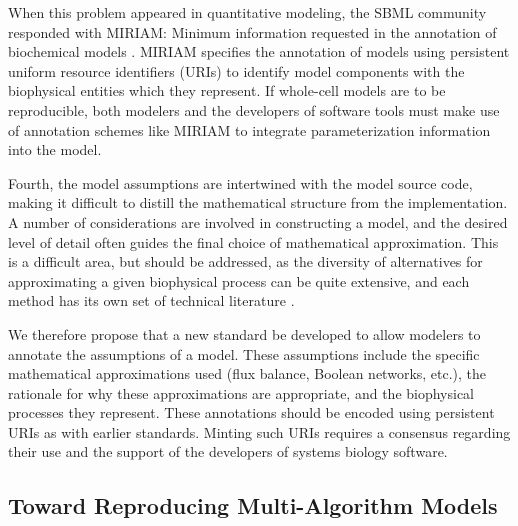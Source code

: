 \documentclass[journal,transmag,twoside]{IEEEtran}
\newcommand{\karrcomment}[2]{\pdfmarkupcomment[markup=Highlight,color=yellow,author={Jonathan Karr}]{#1}{#2}}
\begin{document}
When this problem appeared in quantitative modeling, the SBML community responded with MIRIAM:
Minimum information requested in the annotation of biochemical models \cite{novere2005minimum}.
MIRIAM specifies the annotation of models using persistent uniform resource identifiers (URIs) to identify model
components with the biophysical entities which they represent.
If whole-cell models are to be reproducible, both modelers and the developers of software tools
must make use of annotation schemes like MIRIAM to integrate parameterization information into the model.


Fourth, the model assumptions are intertwined with the model source code, making it difficult
to distill the mathematical structure from the implementation.
A number of considerations are involved in constructing a model, and the desired level of detail
often guides the final choice of mathematical approximation.
This is a difficult area, but should be addressed, as the diversity of alternatives for approximating
a given biophysical process can be quite extensive, and each method has its own set of
technical literature \cite{gunawardena2014models}.

We therefore propose that a new standard be developed to allow modelers to annotate the assumptions
of a model.
These assumptions include the specific mathematical approximations used (flux balance, Boolean networks, etc.),
the rationale for why these approximations are appropriate, and the biophysical processes they represent.
These annotations should be encoded using persistent URIs as with earlier standards.
Minting such URIs requires a consensus regarding their use and the support of the developers of
systems biology software.

\subsection{Toward Reproducing Multi-Algorithm Models}
\end{document}
